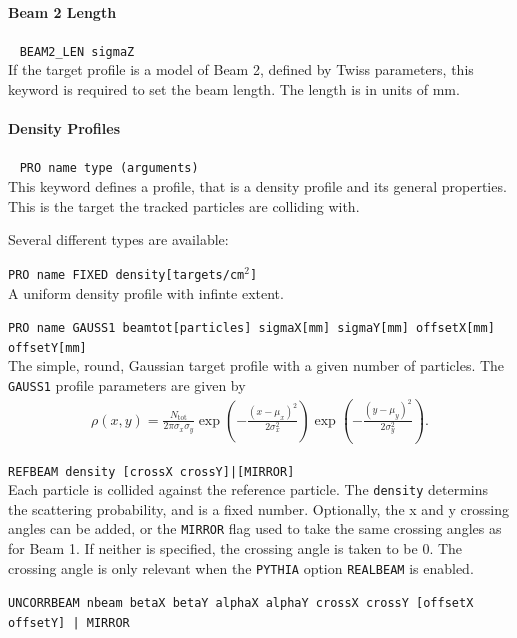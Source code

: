 \paragraph{Beam 2 Length}~ \texttt{BEAM2\_LEN sigmaZ}\\

If the target profile is a model of Beam 2, defined by Twiss parameters, this keyword is required to set the beam length.
The length is in units of mm.

\paragraph{Density Profiles}~ \texttt{PRO name type (arguments)} \\

This keyword defines a profile, that is a density profile and its general properties.
This is the target the tracked particles are colliding with.

Several different types are available:

\bigskip
\noindent\texttt{PRO name FIXED density[targets/cm$^2$]}\\

A uniform density profile with infinte extent.

\bigskip
\noindent\texttt{PRO name GAUSS1 beamtot[particles] sigmaX[mm] sigmaY[mm] offsetX[mm] offsetY[mm]} \\

The simple, round, Gaussian target profile with a given number of particles.
The \texttt{GAUSS1} profile parameters are given by
\begin{align}
    \rho(x,y) = \frac{N_{\mathrm{tot}}}{2\pi\sigma_x\sigma_y}
                \exp\left(-\frac{(x-\mu_x)^2}{2\sigma_x^2}\right)
                \exp\left(-\frac{(y-\mu_y)^2}{2\sigma_y^2}\right).
\end{align}

\bigskip
\noindent\texttt{REFBEAM density [crossX crossY]|[MIRROR]}\\

Each particle is collided against the reference particle.
The \texttt{density} determins the scattering probability, and is a fixed number.
Optionally, the x and y crossing angles can be added, or the \texttt{MIRROR} flag used to take the same crossing angles as for Beam 1.
If neither is specified, the crossing angle is taken to be 0.
The crossing angle is only relevant when the \texttt{PYTHIA} option \texttt{REALBEAM} is enabled.

\bigskip
\noindent\texttt{UNCORRBEAM nbeam betaX betaY alphaX alphaY crossX crossY [offsetX offsetY] | MIRROR}\\

